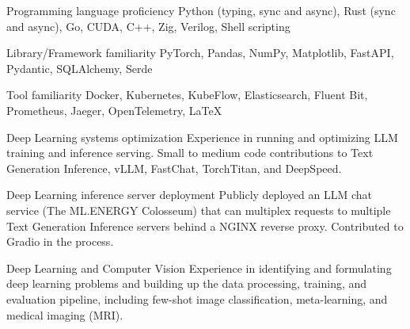 

\begin{cvlist}

  \cvlistitem
    {Programming language proficiency} %
    {Python (typing, sync and async), Rust (sync and async), Go, CUDA, C++, Zig, Verilog, Shell scripting} %

  \cvlistitem
    {Library/Framework familiarity} %
    {PyTorch, Pandas, NumPy, Matplotlib, FastAPI, Pydantic, SQLAlchemy, Serde} %

  \cvlistitem
    {Tool familiarity} %
    {Docker, Kubernetes, KubeFlow, Elasticsearch, Fluent Bit, Prometheus, Jaeger, OpenTelemetry, LaTeX} %

  \cvlistitem
    {Deep Learning systems optimization} %
    {Experience in running and optimizing LLM training and inference serving. Small to medium code contributions to Text Generation Inference, vLLM, FastChat, TorchTitan, and DeepSpeed.} %

  \cvlistitem
    {Deep Learning inference server deployment} %
    {Publicly deployed an LLM chat service (The ML.ENERGY Colosseum) that can multiplex requests to multiple Text Generation Inference servers behind a NGINX reverse proxy. Contributed to Gradio in the process.} %

  \cvlistitem
    {Deep Learning and Computer Vision} %
    {Experience in identifying and formulating deep learning problems and building up the data processing, training, and evaluation pipeline, including few-shot image classification, meta-learning, and medical imaging (MRI).} %

\end{cvlist}
